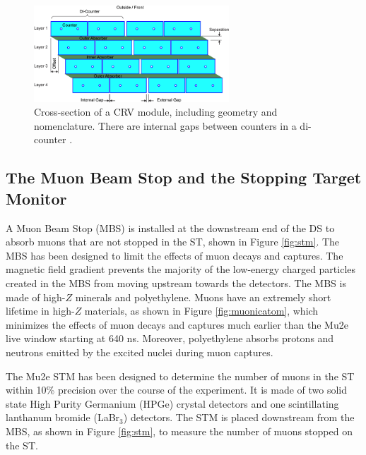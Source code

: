\begin{figure}[!h]
\centering
\includegraphics[width =0.65\textwidth]{figures/png/Crv_module_geometry.png}
\caption[The cross-section of a CRV module.]{Cross-section of a CRV module, including geometry and nomenclature. 
There are internal gaps between counters in a di-counter \cite{Giovannella_2020}.}
\label{fig:crvmodule}
\end{figure}
\subsection{The Muon Beam Stop and the Stopping Target Monitor}
A Muon Beam Stop (MBS) is installed at the downstream end of the DS to 
absorb muons that are not stopped in the ST, shown in Figure \ref{fig:stm}. 
The MBS has been designed to limit the effects of muon decays and captures. 
The magnetic field gradient prevents the majority of the low-energy charged 
particles created in the MBS from moving upstream towards the detectors.  
The MBS is made of high-$Z$ minerals and polyethylene. Muons have an extremely short lifetime in 
high-$Z$ materials, as shown in Figure \ref{fig:muonicatom}, which minimizes the effects of muon 
decays and captures much earlier than the Mu2e live window starting at 640 ns. Moreover, polyethylene 
absorbs protons and neutrons emitted by the excited nuclei during muon captures.  


The Mu2e STM has been designed to determine the number of 
muons in the ST within 10\% precision over the course of the experiment.  
It is made of two solid state High Purity Germanium (HPGe) crystal detectors and one 
scintillating lanthanum bromide (LaBr$_3$) detectors.
The STM is placed downstream from the MBS, as shown in Figure \ref{fig:stm}, 
to measure the number of muons stopped on the ST.

